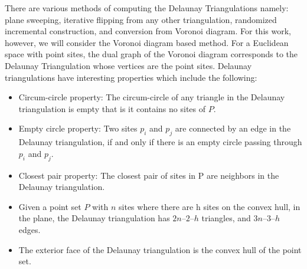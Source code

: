 \documentclass[10pt,a4paper]{article}
\theoremstyle{plain}
\theoremstyle{definition}
\begin{document}
      There are various methods of computing the Delaunay Triangulations namely: plane sweeping, iterative flipping from any other triangulation, randomized incremental construction, and conversion from Voronoi diagram. For this work, however, we will consider the Voronoi diagram based method. For a Euclidean space with point sites, the dual graph of the Voronoi diagram corresponds to the Delaunay Triangulation whose vertices are the point sites. 
      Delaunay triangulations have interesting properties which include the following:
      \begin{itemize}
      	\item Circum-circle property: The circum-circle of any triangle in the Delaunay triangulation
      	is empty that is it contains no sites of $P$.
      	\item Empty circle property: Two sites $p_i$ and $p_j$ are connected by an edge in the Delaunay
      	triangulation, if and only if there is an empty circle passing through $p_i$ and $p_j$.
      	\item Closest pair property: The closest pair of sites in P are neighbors in the Delaunay triangulation.
      	\item Given a point set $P$ with $n$ sites where there are h sites on the convex hull, in the plane, the Delaunay triangulation has $2n – 2 – h$ triangles, and $3n – 3 – h$ edges.
      	\item The exterior face of the Delaunay triangulation is the convex hull of the
      	point set.
      \end{itemize}
  
\end{document}
